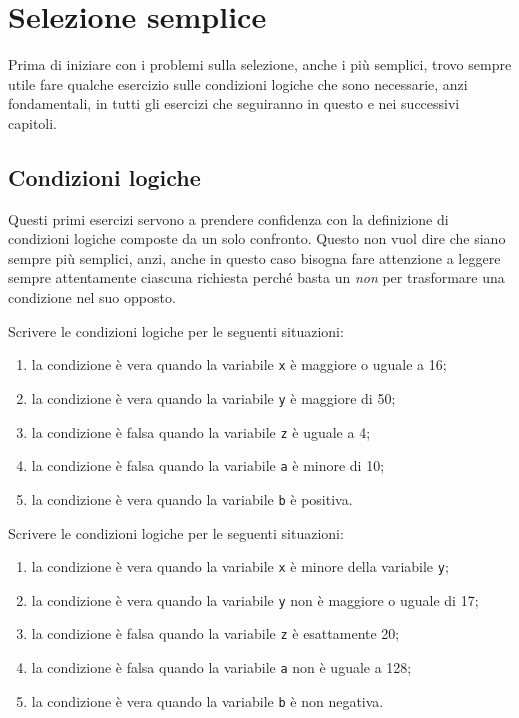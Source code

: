 \chapter{Selezione semplice}

Prima di iniziare con i problemi sulla selezione, anche i più semplici, trovo sempre utile fare qualche esercizio sulle condizioni logiche che sono necessarie, anzi fondamentali, in tutti gli esercizi che seguiranno in questo e nei successivi capitoli.

\section{Condizioni logiche}

Questi primi esercizi servono a prendere confidenza con la definizione di condizioni logiche composte da un solo confronto. Questo non vuol dire che siano sempre più semplici, anzi, anche in questo caso bisogna fare attenzione a leggere sempre attentamente ciascuna richiesta perché basta un \textit{non} per trasformare una condizione nel suo opposto.

\begin{exercise}
	Scrivere le condizioni logiche per le seguenti situazioni:
	\begin{enumerate}
		\item la condizione è vera quando la variabile \texttt{x} è maggiore o uguale a 16;
		\item la condizione è vera quando la variabile \texttt{y} è maggiore di 50;
		\item la condizione è falsa quando la variabile \texttt{z} è uguale a 4;
		\item la condizione è falsa quando la variabile \texttt{a} è minore di 10;
		\item la condizione è vera quando la variabile \texttt{b} è positiva.
	\end{enumerate}
\end{exercise}

\begin{exercise}
	Scrivere le condizioni logiche per le seguenti situazioni:
	\begin{enumerate}
		\item la condizione è vera quando la variabile \texttt{x} è minore della variabile \texttt{y};
		\item la condizione è vera quando la variabile \texttt{y} non è maggiore o uguale di 17;
		\item la condizione è falsa quando la variabile \texttt{z} è esattamente 20;
		\item la condizione è falsa quando la variabile \texttt{a} non è uguale a 128;
		\item la condizione è vera quando la variabile \texttt{b} è non negativa.
	\end{enumerate}
\end{exercise}

